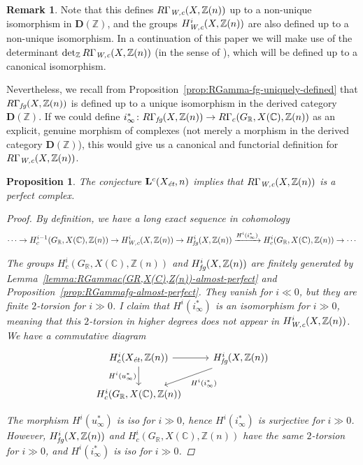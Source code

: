 \documentclass{article}
\newcommand{\CC}{\mathbb{C}}
\newcommand{\RR}{\mathbb{R}}
\newcommand{\ZZ}{\mathbb{Z}}
\newcommand{\et}{\text{\it ét}}
\newcommand{\fg}{\text{\it fg}}
\newcommand{\Wc}{\text{\it W,c}}
\newtheorem{proposition}[theorem]{Proposition}
\theoremstyle{definition}
\newtheorem{remark}[theorem]{Remark}
\numberwithin{equation}{section}
\begin{document}
\begin{remark}
  Note that this defines $R\Gamma_\Wc (X,\ZZ(n))$ up to a non-unique isomorphism
  in $\mathbf{D} (\ZZ)$, and the groups $H_\Wc^i (X, \ZZ (n))$ are also defined
  up to a non-unique isomorphism. In a continuation of this paper we will make
  use of the determinant $\det\nolimits_\ZZ R\Gamma_\Wc (X,\ZZ(n))$ (in the
  sense of \cite{Knudsen-Mumford-1976}), which will be defined up to a canonical
  isomorphism.

  Nevertheless, we recall from Proposition~\ref{prop:RGamma-fg-uniquely-defined}
  that $R\Gamma_\fg (X, \ZZ (n))$ is defined up to a unique isomorphism in the
  derived category $\mathbf{D} (\ZZ)$. If we could define
  $i_\infty^*\colon R\Gamma_\fg (X, \ZZ(n)) \to R\Gamma_c (G_\RR, X(\CC), \ZZ(n))$
  as an explicit, genuine morphism of complexes (not merely a morphism in the
  derived category $\mathbf{D} (\ZZ)$), this would give us a canonical and
  functorial definition for $R\Gamma_\Wc (X, \ZZ(n))$.
\end{remark}

\begin{proposition}
  \label{prop:RGammaWc-perfect}
  The conjecture $\mathbf{L}^c (X_\et, n)$ implies that $R\Gamma_\Wc (X,\ZZ(n))$
  is a perfect complex.

  \begin{proof}
    By definition, we have a long exact sequence in cohomology
    \[ \cdots \to H^{i-1}_c (G_\RR, X (\CC), \ZZ (n)) \to
    H^i_\Wc (X,\ZZ(n)) \to
    H^i_\fg (X,\ZZ(n)) \xrightarrow{H^i (i_\infty^*)}
    H^i_c (G_\RR, X (\CC), \ZZ (n)) \to \cdots \]

    The groups $H^i_c (G_\RR, X (\CC), \ZZ (n))$ and $H^i_\fg (X, \ZZ(n))$ are
    finitely generated by Lemma~\ref{lemma:RGammac(GR,X(C),Z(n))-almost-perfect}
    and Proposition~\ref{prop:RGammafg-almost-perfect}. They vanish for
    $i \ll 0$, but they are finite $2$-torsion for $i \gg 0$. I claim that
    $H^i (i_\infty^*)$ is an isomorphism for $i \gg 0$, meaning that this
    $2$-torsion in higher degrees does not appear in $H^i_\Wc (X,\ZZ(n))$.
    We have a commutative diagram
    \[ \begin{tikzcd}
      H^i_c (X_\et, \ZZ (n))\ar{r}\ar{d}[swap]{H^i (u_\infty^*)} & H^i_\fg (X, \ZZ (n))\ar{dl}{H^i (i_\infty^*)} \\
      H^i_c (G_\RR, X (\CC), \ZZ (n))
    \end{tikzcd} \]

    The morphism $H^i (u_\infty^*)$ is iso for $i \gg 0$, hence
    $H^i (i_\infty^*)$ is surjective for $i \gg 0$. However,
    $H^i_\fg (X, \ZZ (n))$ and $H^i_c (G_\RR, X (\CC), \ZZ (n))$ have the same
    $2$-torsion for $i \gg 0$, and $H^i (i_\infty^*)$ is iso for $i \gg 0$.
  \end{proof}
\end{proposition}
\end{document}
